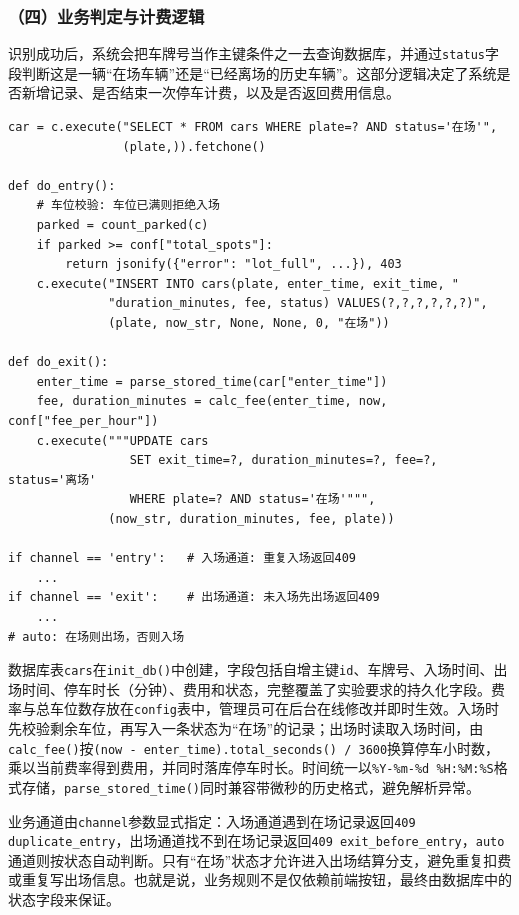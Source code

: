 \documentclass[12pt,a4paper]{article}
\begin{document}
\subsubsection*{（四）业务判定与计费逻辑}
识别成功后，系统会把车牌号当作主键条件之一去查询数据库，并通过\texttt{status}字段判断这是一辆“在场车辆”还是“已经离场的历史车辆”。这部分逻辑决定了系统是否新增记录、是否结束一次停车计费，以及是否返回费用信息。

\begin{lstlisting}
car = c.execute("SELECT * FROM cars WHERE plate=? AND status='在场'",
                (plate,)).fetchone()

def do_entry():
    # 车位校验: 车位已满则拒绝入场
    parked = count_parked(c)
    if parked >= conf["total_spots"]:
        return jsonify({"error": "lot_full", ...}), 403
    c.execute("INSERT INTO cars(plate, enter_time, exit_time, "
              "duration_minutes, fee, status) VALUES(?,?,?,?,?,?)",
              (plate, now_str, None, None, 0, "在场"))

def do_exit():
    enter_time = parse_stored_time(car["enter_time"])
    fee, duration_minutes = calc_fee(enter_time, now, conf["fee_per_hour"])
    c.execute("""UPDATE cars
                 SET exit_time=?, duration_minutes=?, fee=?, status='离场'
                 WHERE plate=? AND status='在场'""",
              (now_str, duration_minutes, fee, plate))

if channel == 'entry':   # 入场通道: 重复入场返回409
    ...
if channel == 'exit':    # 出场通道: 未入场先出场返回409
    ...
# auto: 在场则出场，否则入场
\end{lstlisting}

数据库表\texttt{cars}在\texttt{init\_db()}中创建，字段包括自增主键\texttt{id}、车牌号、入场时间、出场时间、停车时长（分钟）、费用和状态，完整覆盖了实验要求的持久化字段。费率与总车位数存放在\texttt{config}表中，管理员可在后台在线修改并即时生效。入场时先校验剩余车位，再写入一条状态为“在场”的记录；出场时读取入场时间，由\texttt{calc\_fee()}按\texttt{(now - enter\_time).total\_seconds() / 3600}换算停车小时数，乘以当前费率得到费用，并同时落库停车时长。时间统一以\texttt{\%Y-\%m-\%d \%H:\%M:\%S}格式存储，\texttt{parse\_stored\_time()}同时兼容带微秒的历史格式，避免解析异常。

业务通道由\texttt{channel}参数显式指定：入场通道遇到在场记录返回\texttt{409 duplicate\_entry}，出场通道找不到在场记录返回\texttt{409 exit\_before\_entry}，\texttt{auto}通道则按状态自动判断。只有“在场”状态才允许进入出场结算分支，避免重复扣费或重复写出场信息。也就是说，业务规则不是仅依赖前端按钮，最终由数据库中的状态字段来保证。
\end{document}

